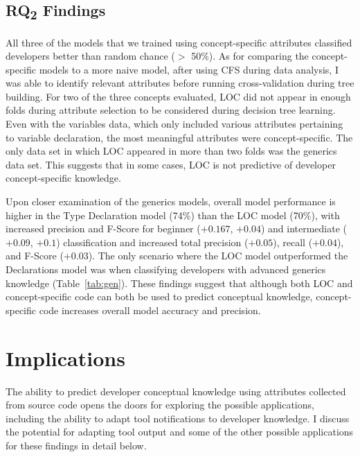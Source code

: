 \subsection{RQ\textsubscript{2} Findings}

All three of the models that we trained using concept-specific attributes classified developers better than random chance ($>$ 50\%).
As for comparing the concept-specific models to a more naive model, after using CFS during data analysis, I was able to identify relevant attributes before running cross-validation during tree building. For two of the three concepts evaluated, LOC did not appear in enough folds during attribute selection to be considered during decision tree learning. Even with the variables data, which only included various attributes pertaining to variable declaration, the most meaningful attributes were concept-specific. The only data set in which LOC appeared in more than two folds was the generics data set. This suggests that in some cases, LOC is not predictive of developer concept-specific knowledge.

Upon closer examination of the generics models, overall model performance is higher in the Type Declaration model (74\%) than the LOC model (70\%), with increased precision and F-Score for beginner (\(+ 0.167\), \(+ 0.04\)) and intermediate (\(+ 0.09\), \(+ 0.1\)) classification and increased total precision (\(+ 0.05\)), recall (\(+ 0.04\)), and F-Score (\(+ 0.03\)). 
The only scenario where the LOC model outperformed the Declarations model was when classifying developers with advanced generics knowledge (Table~\ref{tab:gen}). 
These findings suggest that although both LOC and concept-specific code can both be used to predict conceptual knowledge, concept-specific code increases overall model accuracy and precision.

\vspace{1em}

\vspace{0.5em}


\section{Implications}\label{sec:disc}
The ability to predict developer conceptual knowledge using attributes collected from source code opens the doors for exploring the possible applications, including the ability to adapt tool notifications to developer knowledge. 
I discuss the potential for adapting tool output and some of the other possible applications for these findings in detail below.

